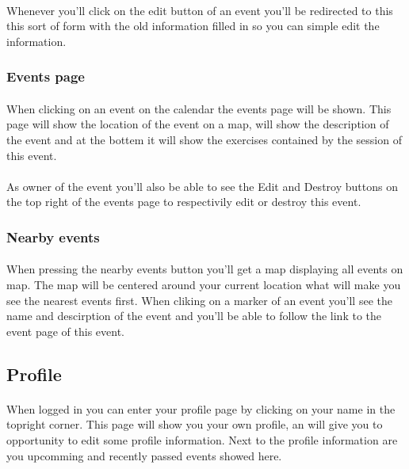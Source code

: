 \documentclass[11pt,a4paper]{scrartcl}
\begin{document}
\paragraph{}Whenever you'll click on the edit button of an event you'll be redirected to this this sort of form with the old information filled in so you can simple edit the information.
\subsubsection{Events page}
\paragraph{}When clicking on an event on the calendar the events page will be shown. This page will show the location of the event on a map, will show the description of the event and at the bottem it will show the exercises contained by the session of this event.
\paragraph{}As owner of the event you'll also be able to see the Edit and Destroy buttons on the top right of the events page to respectivily edit or destroy this event.
\subsubsection{Nearby events}
\paragraph{}When pressing the nearby events button you'll get a map displaying all events on map. The map will be centered around your current location what will make you see the nearest events first. When cliking on a marker of an event you'll see the name and descirption of the event and you'll be able to follow the link to the event page of this event.
\subsection{Profile}
\paragraph{}When logged in you can enter your profile page by clicking on your name in the topright corner. This page will show you your own profile, an will give you to opportunity to edit some profile information. Next to the profile information are you upcomming and recently passed events showed here.
\end{document}
